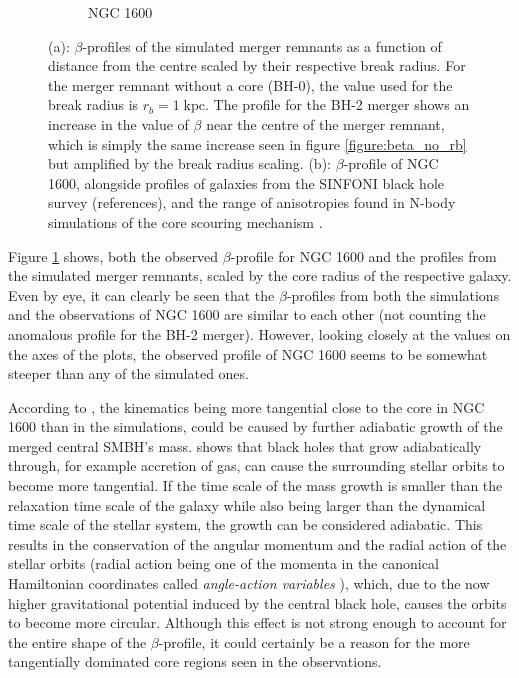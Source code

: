 \documentclass[english, oneside]{HYgradu}
\begin{document}
\begin{figure}
\begin{subfigure}[b]{0.60\textwidth}
		\caption{NGC 1600}
	\end{subfigure}
	\caption{(a): $\beta$-profiles of the simulated merger remnants as a function of distance from the centre scaled by their respective break radius. For the merger remnant without a core (BH-0), the value used for the break radius is $r_b = 1 \; \mathrm{kpc}$. The profile for the BH-2 merger shows an increase in the value of $\beta$ near the centre of the merger remnant, which is simply the same increase seen in figure \ref{figure:beta_no_rb} but amplified by the break radius scaling. (b): $\beta$-profile of NGC 1600, alongside profiles of galaxies from the SINFONI black hole survey (references), and the range of anisotropies found in N-body simulations of the core scouring mechanism \citep{Thomas2016}.}
	\label{figure:beta_NGC1600_Simul}
\end{figure}

Figure \ref{figure:beta_NGC1600_Simul} shows, both the observed $\beta$-profile for NGC 1600 and the profiles from the simulated merger remnants, scaled by the core radius of the respective galaxy. Even by eye, it can clearly be seen that the $\beta$-profiles from both the simulations and the observations of NGC 1600 are similar to each other (not counting the anomalous profile for the BH-2 merger). However, looking closely at the values on the axes of the plots, the observed profile of NGC 1600 seems to be  somewhat steeper than any of the simulated ones.


According to \cite{Rantala2018}, the kinematics being more tangential close to the core in NGC 1600 than in the simulations, could be caused by further adiabatic growth of the merged central SMBH's mass. \cite{Young1980} shows that black holes that grow adiabatically through, for example accretion of gas, can cause the surrounding stellar orbits to become more tangential. If the time scale of the mass growth is smaller than the relaxation time scale of the galaxy while also being larger than the dynamical time scale of the stellar system, the growth can be considered adiabatic. This results in the conservation of the angular momentum and the radial action of the stellar orbits (radial action being one of the momenta in the canonical Hamiltonian coordinates called \textit{angle-action variables} \citep{BinneyTremaine}), which, due to the now higher gravitational potential induced by the central black hole, causes the orbits to become more circular. Although this effect is not strong enough to account for the entire shape of the $\beta$-profile, it could certainly be a reason for the more tangentially dominated core regions seen in the observations.
\end{document}

